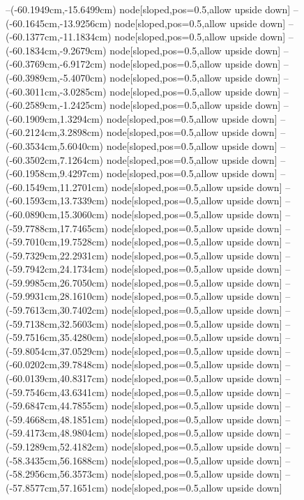 --(-60.1949cm,-15.6499cm) node[sloped,pos=0.5,allow upside down]{\ArrowIn}
--(-60.1645cm,-13.9256cm) node[sloped,pos=0.5,allow upside down]{\ArrowIn}
--(-60.1377cm,-11.1834cm) node[sloped,pos=0.5,allow upside down]{\ArrowIn}
--(-60.1834cm,-9.2679cm) node[sloped,pos=0.5,allow upside down]{\ArrowIn}
--(-60.3769cm,-6.9172cm) node[sloped,pos=0.5,allow upside down]{\ArrowIn}
--(-60.3989cm,-5.4070cm) node[sloped,pos=0.5,allow upside down]{\ArrowIn}
--(-60.3011cm,-3.0285cm) node[sloped,pos=0.5,allow upside down]{\ArrowIn}
--(-60.2589cm,-1.2425cm) node[sloped,pos=0.5,allow upside down]{\ArrowIn}
--(-60.1909cm,1.3294cm) node[sloped,pos=0.5,allow upside down]{\ArrowIn}
--(-60.2124cm,3.2898cm) node[sloped,pos=0.5,allow upside down]{\ArrowIn}
--(-60.3534cm,5.6040cm) node[sloped,pos=0.5,allow upside down]{\ArrowIn}
--(-60.3502cm,7.1264cm) node[sloped,pos=0.5,allow upside down]{\ArrowIn}
--(-60.1958cm,9.4297cm) node[sloped,pos=0.5,allow upside down]{\ArrowIn}
--(-60.1549cm,11.2701cm) node[sloped,pos=0.5,allow upside down]{\ArrowIn}
--(-60.1593cm,13.7339cm) node[sloped,pos=0.5,allow upside down]{\ArrowIn}
--(-60.0890cm,15.3060cm) node[sloped,pos=0.5,allow upside down]{\ArrowIn}
--(-59.7788cm,17.7465cm) node[sloped,pos=0.5,allow upside down]{\ArrowIn}
--(-59.7010cm,19.7528cm) node[sloped,pos=0.5,allow upside down]{\ArrowIn}
--(-59.7329cm,22.2931cm) node[sloped,pos=0.5,allow upside down]{\ArrowIn}
--(-59.7942cm,24.1734cm) node[sloped,pos=0.5,allow upside down]{\ArrowIn}
--(-59.9985cm,26.7050cm) node[sloped,pos=0.5,allow upside down]{\ArrowIn}
--(-59.9931cm,28.1610cm) node[sloped,pos=0.5,allow upside down]{\ArrowIn}
--(-59.7613cm,30.7402cm) node[sloped,pos=0.5,allow upside down]{\ArrowIn}
--(-59.7138cm,32.5603cm) node[sloped,pos=0.5,allow upside down]{\ArrowIn}
--(-59.7516cm,35.4280cm) node[sloped,pos=0.5,allow upside down]{\ArrowIn}
--(-59.8054cm,37.0529cm) node[sloped,pos=0.5,allow upside down]{\ArrowIn}
--(-60.0202cm,39.7848cm) node[sloped,pos=0.5,allow upside down]{\ArrowIn}
--(-60.0139cm,40.8317cm) node[sloped,pos=0.5,allow upside down]{\ArrowIn}
--(-59.7546cm,43.6341cm) node[sloped,pos=0.5,allow upside down]{\ArrowIn}
--(-59.6847cm,44.7855cm) node[sloped,pos=0.5,allow upside down]{\ArrowIn}
--(-59.4668cm,48.1851cm) node[sloped,pos=0.5,allow upside down]{\ArrowIn}
--(-59.4173cm,48.9804cm) node[sloped,pos=0.5,allow upside down]{\arrowIn}
--(-59.1289cm,52.4182cm) node[sloped,pos=0.5,allow upside down]{\ArrowIn}
--(-58.3435cm,56.1688cm) node[sloped,pos=0.5,allow upside down]{\ArrowIn}
--(-58.2956cm,56.3573cm) node[sloped,pos=0.5,allow upside down]{\arrowIn}
--(-57.8577cm,57.1651cm) node[sloped,pos=0.5,allow upside down]{\arrowIn}
